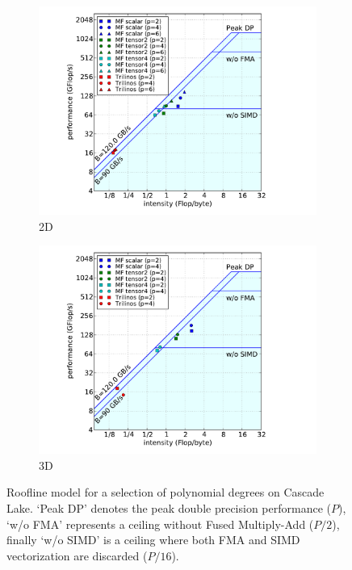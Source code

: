 \documentclass[AMA,STIX1COL]{WileyNJD-v2}
\begin{document}
\begin{figure}[!ht]
  \centering
  \begin{subfigure}[b]{0.49\textwidth}
    \centering
    \includegraphics[width=\textwidth]{LIKWID_CSL_Munich_roofline_2d.pdf}
    \caption{2D}
    \label{fig:roofline_2d}
  \end{subfigure}
  \begin{subfigure}[b]{0.49\textwidth}
    \centering
    \includegraphics[width=\textwidth]{LIKWID_CSL_Munich_roofline_3d.pdf}
    \caption{3D}
    \label{fig:roofline_3d}
  \end{subfigure}
  \caption{Roofline model for a selection of polynomial degrees on Cascade Lake. `Peak DP' denotes the peak double precision performance ($P$),
  `w/o FMA' represents a ceiling without Fused Multiply-Add ($P/2$), finally `w/o SIMD' is a ceiling where both FMA
    and SIMD vectorization are discarded ($P/16$).}%
  \label{fig:roofline}
\end{figure}
\end{document}

